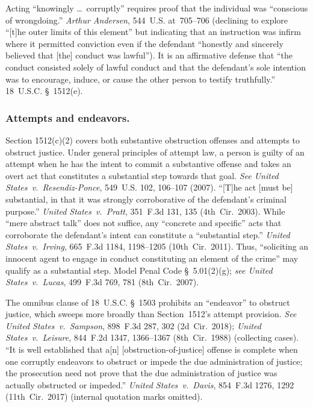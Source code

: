 Acting ``knowingly \dots\ corruptly'' requires proof that the individual was ``conscious of wrongdoing.''
\textit{Arthur Andersen}, 544~U.S. at~705--706 (declining to explore ``[t]he outer limits of this element'' but indicating that an instruction was infirm where it permitted conviction even if the defendant ``honestly and sincerely believed that [the] conduct was lawful'').
It is an affirmative defense that ``the conduct consisted solely of lawful conduct and that the defendant's sole intention was to encourage, induce, or cause the other person to testify truthfully.''
18~U.S.C. \S~1512(e).

\subsubsection*{Attempts and endeavors.}

Section 1512(c)(2) covers both substantive obstruction offenses and attempts to obstruct justice. Under general principles of attempt law, a person is guilty of an attempt when he has the intent to commit a substantive offense and takes an overt act that constitutes a substantial step towards that goal.
\textit{See United States~v.\ Resendiz-Ponce}, 549~U.S. 102, 106--107 (2007).
``[T]he act [must be] substantial, in that it was strongly corroborative of the defendant's criminal purpose.''
\textit{United States~v.\ Pratt}, 351~F.3d 131, 135 (4th~Cir.~2003).
While ``mere abstract talk'' does not suffice, any ``concrete and specific'' acts that corroborate the defendant's intent can constitute a ``substantial step.''
\textit{United States~v.\ Irving}, 665~F.3d 1184, 1198--1205 (10th~Cir.~2011).
Thus, ``soliciting an innocent agent to engage in conduct constituting an element of the crime'' may qualify as a substantial step.
Model Penal Code \S~5.01(2)(g);
\textit{see United States~v.\ Lucas}, 499~F.3d 769, 781 (8th~Cir.~2007).

The omnibus clause of 18~U.S.C. \S~1503 prohibits an ``endeavor'' to obstruct justice, which sweeps more broadly than Section~1512's attempt provision.
\textit{See United States~v.\ Sampson}, 898~F.3d 287, 302 (2d~Cir.~2018);
\textit{United States~v.\ Leisure}, 844~F.2d 1347, 1366--1367 (8th~Cir.~1988) (collecting cases).
``It is well established that a[n] [obstruction-of-justice] offense is complete when one corruptly endeavors to obstruct or impede the due administration of justice;
the prosecution need not prove that the due administration of justice was actually obstructed or impeded.''
\textit{United States~v.\ Davis}, 854~F.3d 1276, 1292 (11th~Cir.~2017) (internal quotation marks omitted).

